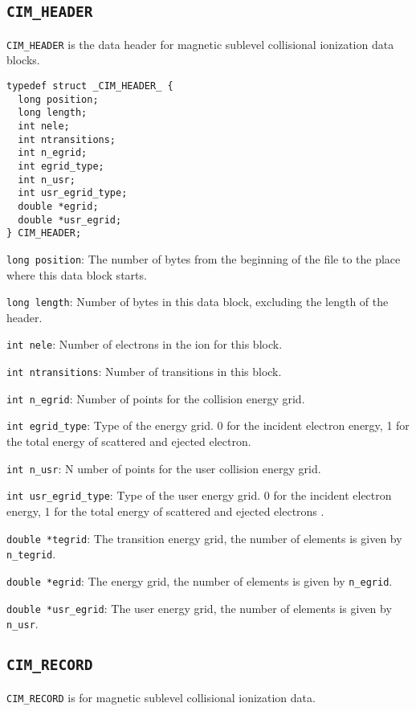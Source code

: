 \subsection{\texttt{CIM\_HEADER}}
\texttt{CIM\_HEADER} is the data header for magnetic sublevel collisional
ionization data blocks. 

\begin{verbatim}
typedef struct _CIM_HEADER_ {
  long position;
  long length;
  int nele;
  int ntransitions;
  int n_egrid;
  int egrid_type;
  int n_usr;
  int usr_egrid_type;
  double *egrid;
  double *usr_egrid;
} CIM_HEADER;
\end{verbatim}

\begin{dbdesc}
\item[\texttt{long position}:] The number of bytes from the beginning of the
file to the place where this data block starts.
\item[\texttt{long length}:] Number of bytes in this data block, excluding the
length of the header.
\item[\texttt{int nele}:] Number of electrons in the ion for this block.
\item[\texttt{int ntransitions}:] Number of transitions in this block.
\item[\texttt{int n\_egrid}:] Number of points for the collision energy grid.
\item[\texttt{int egrid\_type}:] Type of the energy grid. 0 for the incident
electron energy, 1 for the total energy of scattered and ejected electron.
\item[\texttt{int n\_usr}:]N umber of points for the user collision energy
grid.
\item[\texttt{int usr\_egrid\_type}:] Type of the user energy grid. 0 for the
incident electron energy, 1 for the total energy of scattered and ejected
electrons .
\item[\texttt{double *tegrid}:] The transition energy grid, the number of
elements is given by \texttt{n\_tegrid}.
\item[\texttt{double *egrid}:] The energy grid, the number of elements is
given by \texttt{n\_egrid}.
\item[\texttt{double *usr\_egrid}:] The user energy grid, the number of
elements is given by \texttt{n\_usr}.
\end{dbdesc}

\subsection{\texttt{CIM\_RECORD}}
\texttt{CIM\_RECORD} is for magnetic sublevel collisional ionization data.

